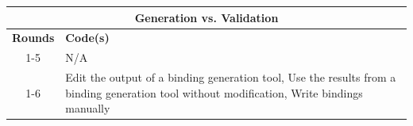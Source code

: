\centering
\small
\begin{tabular}{|c|p{10cm}|}
\hline
\multicolumn{2}{|c|}{\textbf{Generation vs. Validation}}  \\ \hline
\textbf{Rounds} & \textbf{Code(s)}                                                                                                                                    \\ \hline
1-5    & N/A                                                                                                                                        \\ \hline
1-6    & Edit the output of a binding generation tool, Use the results from a binding generation tool without modification, Write bindings manually \\ \hline
\end{tabular}
